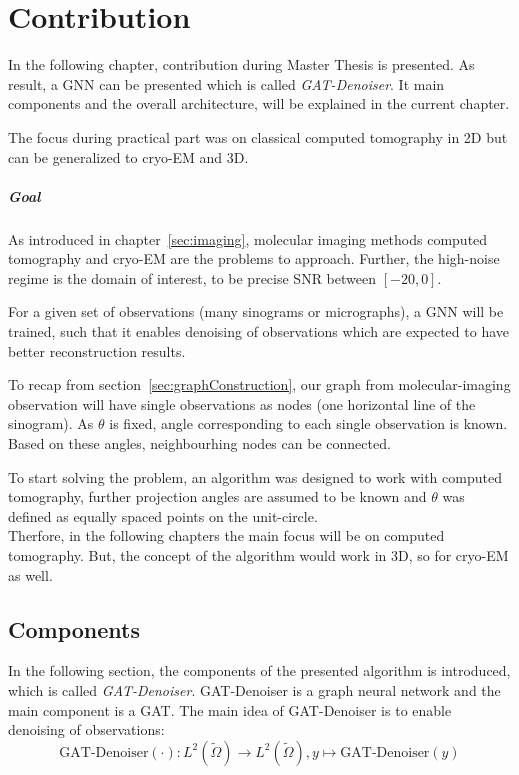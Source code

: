 \chapter{Contribution}
\label{sec:contribution}

In the following chapter, contribution during Master Thesis is presented.
As result, a GNN can be presented which is called \textit{GAT-Denoiser}.
It main components and the overall architecture, will be explained in the current chapter.

The focus during practical part was on classical computed tomography in 2D but
can be generalized to cryo-EM and 3D.


\paragraph{Goal}
As introduced in chapter~\ref{sec:imaging}, molecular imaging methods computed tomography and cryo-EM are the problems
to approach. Further, the high-noise regime is the domain of interest, to be precise SNR between $[-20, 0]$.

For a given set of observations (many sinograms or micrographs), a GNN will be trained, such that
it enables denoising of observations which are expected to have better reconstruction results.

To recap from section~\ref{sec:graphConstruction}, our graph from molecular-imaging observation
will have single observations as nodes (one horizontal line of the sinogram). 
As $\theta$ is fixed, angle corresponding to each single observation is known. 
Based on these angles, neighbourhing nodes can be connected.


\begin{tcolorbox}[colback=red!5!white,colframe=red!75!black]
  To start solving the problem, an algorithm was designed to work with computed tomography, further
  projection angles are assumed to be known and $\theta$ was defined as equally spaced points on the unit-circle. \\

  Therfore, in the following chapters the main focus will be on computed tomography. 
  But, the concept of the algorithm would work in 3D, so for cryo-EM as well.
\end{tcolorbox}



\section{Components}
In the following section, the components of the presented algorithm is introduced, which is called \textit{GAT-Denoiser}. 
GAT-Denoiser is a graph neural network and the main component is a GAT. 
The main idea of GAT-Denoiser is to enable denoising of observations:
\begin{equation}
  \text{GAT-Denoiser} (\cdot) : L^2(\tilde{\Omega}) \to  L^2(\tilde{\Omega}) , y \mapsto \text{GAT-Denoiser} (y) 
\end{equation}

